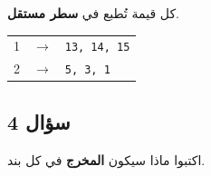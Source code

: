 \documentclass[14pt]{extarticle}
\begin{document}
\ifwithsols
\begin{boxSolution}
كل قيمة تُطبع في \textbf{سطر مستقل}.

\begin{english}
\renewcommand{\arraystretch}{1.2}
\begin{tabular}{rcl}
1 & $\rightarrow$ & \texttt{13, 14, 15} \\
2 & $\rightarrow$ & \texttt{5, 3, 1} \\
\end{tabular}
\end{english}
\end{boxSolution}
\fi

\clearpage
\subsection*{سؤال 4}
اكتبوا ماذا سيكون \textbf{المخرج} في كل بند.
\end{document}
